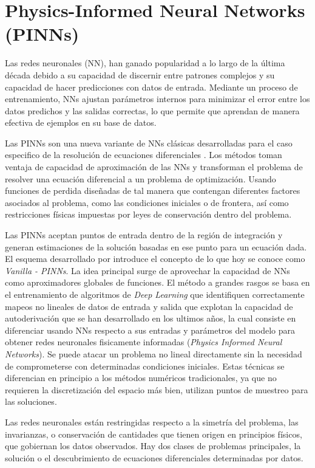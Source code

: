\section{Physics-Informed Neural Networks (PINNs)}

Las redes neuronales (NN), han ganado popularidad a lo largo de la última década debido a su capacidad de discernir entre patrones complejos y su capacidad de hacer predicciones con datos de entrada. Mediante un proceso de entrenamiento, NNs ajustan parámetros internos para minimizar el error entre los datos predichos y las salidas correctas, lo que permite que aprendan de manera efectiva de ejemplos en su base de datos.

Las PINNs son una nueva variante de NNs clásicas desarrolladas para el caso especifico de la resolución de ecuaciones diferenciales \cite{sophiya2025} . Los métodos toman ventaja de capacidad de aproximación de las NNs y transforman el problema de resolver una ecuación diferencial a un problema de optimización. Usando funciones de perdida diseñadas de tal manera que contengan diferentes factores asociados al problema, como las condiciones iniciales o de frontera, así como restricciones físicas impuestas por leyes de conservación dentro del problema. 

Las PINNs aceptan puntos de entrada dentro de la región de integración y generan estimaciones de la solución basadas en ese punto para un ecuación dada.  El esquema desarrollado por \cite{raissi2019} introduce el concepto de lo que hoy se conoce como \textit{Vanilla - PINNs}. La idea principal surge de aprovechar la capacidad de NNs como aproximadores globales de funciones. El método a grandes rasgos se basa en el entrenamiento de algoritmos de \textit{Deep Learning} que identifiquen correctamente mapeos no lineales de datos de entrada y salida que explotan la capacidad de autoderivación que se han desarrollado en los ultimos años, la cual consiste en diferenciar usando NNs respecto a sus entradas y parámetros del modelo para obtener redes neuronales fisicamente informadas (\textit{Physics Informed Neural Networks}). Se puede atacar un problema no lineal directamente sin la necesidad de comprometerse con determinadas condiciones iniciales. Estas técnicas se diferencian en principio a los métodos numéricos tradicionales, ya que no requieren la discretización del espacio más bien, utilizan puntos de muestreo para las soluciones. 


Las redes neuronales están restringidas respecto a la simetría del problema, las invarianzas, o conservación de cantidades que tienen origen en principios físicos, que gobiernan los datos observados. Hay dos clases de problemas principales, la solución o el descubrimiento de ecuaciones diferenciales determinadas por datos. 

